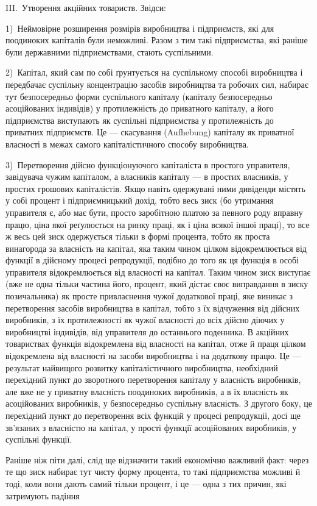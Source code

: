 \parcont{}  %

III.~Утворення акційних товариств. Звідси:

1)~Неймовірне розширення розмірів виробництва і підприємств, які для поодиноких капіталів були
неможливі. Разом з тим
такі підприємства, які раніше були державними підприємствами,
стають суспільними.

2)~Капітал, який сам по собі ґрунтується на суспільному
способі виробництва і передбачає суспільну концентрацію засобів виробництва та робочих сил, набирає
тут безпосередньо
форми суспільного капіталу (капіталу безпосередньо асоційованих індивідів) у протилежність до
приватного капіталу, а його
підприємства виступають як суспільні підприємства у протилежність до приватних підприємств. Це —
скасування (Aufhebung)
капіталу як приватної власності в межах самого капіталістичного способу виробництва.

3)~Перетворення дійсно функціонуючого капіталіста в простого управителя, завідувача чужим капіталом,
а власників
капіталу — в простих власників, у простих грошових капіталістів. Якщо навіть одержувані ними
дивіденди містять у собі
процент і підприємницький дохід, тобто весь зиск (бо утримання управителя є, або має бути, просто
заробітною платою за
певного роду вправну працю, ціна якої реґулюється на ринку
праці, як і ціна всякої іншої праці), то все ж весь цей зиск
одержується тільки в формі процента, тобто як проста винагорода за власність на капітал, яка таким
чином цілком відокремлюється від функції в дійсному процесі репродукції, подібно
до того як ця функція в особі управителя відокремлюється від
власності на капітал. Таким чином зиск виступає (вже не одна
тільки частина його, процент, який дістає своє виправдання
в зиску позичальника) як просте привласнення чужої додаткової
праці, яке виникає з перетворення засобів виробництва в капітал, тобто з їх відчуження від дійсних
виробників, з їх протилежності як чужої власності до всіх дійсно діючих у виробництві індивідів, від
управителя до останнього поденника.
В акційних товариствах функція відокремлена від власності на
капітал, отже й праця цілком відокремлена від власності на
засоби виробництва і на додаткову працю. Це — результат найвищого розвитку капіталістичного
виробництва, необхідний
перехідний пункт до зворотного перетворення капіталу у власність виробників, але вже не у приватну
власність поодиноких
виробників, а в їх власність як асоційованих виробників, у безпосередньо суспільну власність. З
другого боку, це перехідний пункт до перетворення всіх функцій у процесі репродукції,
досі ще зв’язаних з власністю на капітал, у прості функції асоційованих виробників, у суспільні
функції.

Раніше ніж піти далі, слід ще відзначити такий економічно
важливий факт: через те що зиск набирає тут чисту форму процента, то такі підприємства можливі й
тоді, коли вони дають самий
тільки процент, і це — одна з тих причин, які затримують падіння
\parbreak{}  %
